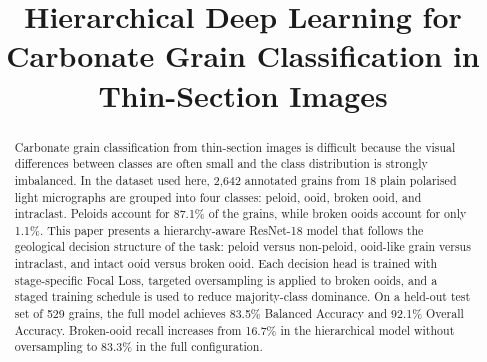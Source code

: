 \documentclass[conference, a4paper]{IEEEtran}
\begin{document}
\title{Hierarchical Deep Learning for Carbonate Grain Classification in Thin-Section Images}

\makeatletter
\def\@IEEEauthorblockNfont{\fontsize{11pt}{13pt}\selectfont}
\def\@IEEEauthorblockAfont{\fontsize{10pt}{12pt}\selectfont}
\makeatother

\author{
\and
{}
\and
{}
}

\maketitle

\begin{abstract}
Carbonate grain classification from thin-section images is difficult because the visual differences between classes are often small and the class distribution is strongly imbalanced. In the dataset used here, 2,642 annotated grains from 18 plain polarised light micrographs are grouped into four classes: peloid, ooid, broken ooid, and intraclast. Peloids account for 87.1\% of the grains, while broken ooids account for only 1.1\%. This paper presents a hierarchy-aware ResNet-18 model that follows the geological decision structure of the task: peloid versus non-peloid, ooid-like grain versus intraclast, and intact ooid versus broken ooid. Each decision head is trained with stage-specific Focal Loss, targeted oversampling is applied to broken ooids, and a staged training schedule is used to reduce majority-class dominance. On a held-out test set of 529 grains, the full model achieves 83.5\% Balanced Accuracy and 92.1\% Overall Accuracy. Broken-ooid recall increases from 16.7\% in the hierarchical model without oversampling to 83.3\% in the full configuration.
\end{abstract}
\end{document}
